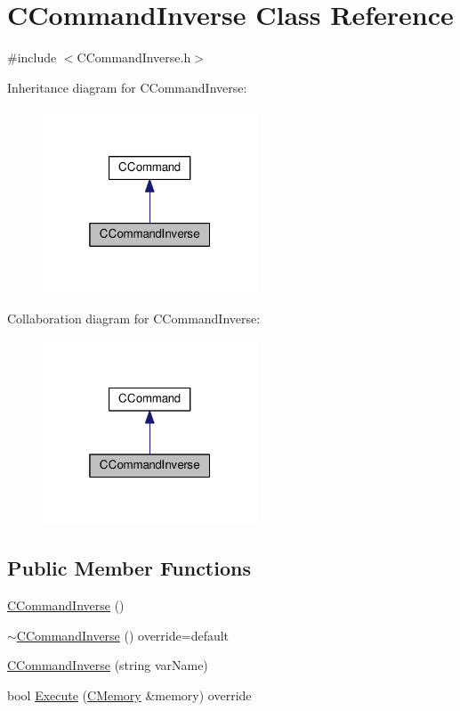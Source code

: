 \hypertarget{classCCommandInverse}{}\section{C\+Command\+Inverse Class Reference}
\label{classCCommandInverse}


{\ttfamily \#include $<$C\+Command\+Inverse.\+h$>$}



Inheritance diagram for C\+Command\+Inverse\+:\nopagebreak
\begin{figure}[H]
\begin{center}
\leavevmode
\includegraphics[width=181pt]{classCCommandInverse__inherit__graph}
\end{center}
\end{figure}


Collaboration diagram for C\+Command\+Inverse\+:\nopagebreak
\begin{figure}[H]
\begin{center}
\leavevmode
\includegraphics[width=181pt]{classCCommandInverse__coll__graph}
\end{center}
\end{figure}
\subsection*{Public Member Functions}
\begin{DoxyCompactItemize}
\item 
\hyperlink{classCCommandInverse_a9573921cedbcfd0a0e5e16157e120855}{C\+Command\+Inverse} ()
\item 
\hyperlink{classCCommandInverse_adb4a4a3be76c91fbfb8cbefb920fd4d1}{$\sim$\+C\+Command\+Inverse} () override=default
\item 
\hyperlink{classCCommandInverse_a7b55a6f59f8dd6ae62e44297cf6c6740}{C\+Command\+Inverse} (string var\+Name)
\item 
bool \hyperlink{classCCommandInverse_aa579b94f10fa18b4759fd2986629f7db}{Execute} (\hyperlink{classCMemory}{C\+Memory} \&memory) override
\end{DoxyCompactItemize}
